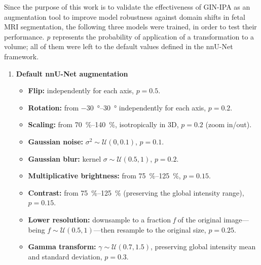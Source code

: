 Since the purpose of this work is to validate the effectiveness of GIN-IPA as an augmentation tool to improve model robustness against domain shifts in fetal MRI segmentation, the following three models were trained, in order to test their performance. \textit{p} represents the probability of application of a transformation to a volume; all of them were left to the default values defined in the nnU-Net framework.
\begin{enumerate}

    \item \textbf{Default nnU-Net augmentation}
    \begin{itemize}
        \item \textbf{Flip:} independently for each axis, $p=0.5$.
        \item \textbf{Rotation:} from \qtyrange{-30}{30}{\degree} independently for each axis, $p=0.2$.
        \item \textbf{Scaling:} from \qtyrange{70}{140}{\percent}, isotropically in 3D, $p=0.2$ (zoom in/out).
        \item \textbf{Gaussian noise:} $\sigma^2 \sim \mathcal{U}(0, 0.1)$, $p=0.1$.
        \item \textbf{Gaussian blur:} kernel $\sigma \sim \mathcal{U}(0.5, 1)$, $p=0.2$.
        \item \textbf{Multiplicative brightness:} from \qtyrange{75}{125}{\percent}, $p=0.15$.
        \item \textbf{Contrast:} from \qtyrange{75}{125}{\percent} (preserving the global intensity range), $p=0.15$.
        \item \textbf{Lower resolution:} downsample to a fraction \textit{f} of the original image---being $f \sim \mathcal{U}(0.5, 1)$---then resample to the original size, $p=0.25$.
        \item \textbf{Gamma transform:} $\gamma \sim \mathcal{U}(0.7, 1.5)$, preserving global intensity mean and standard deviation, $p=0.3$.
    \end{itemize}


\end{enumerate}
